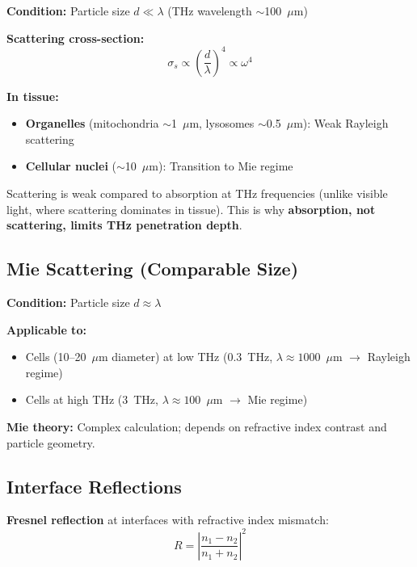 \textbf{Condition:} Particle size $d \ll \lambda$ (THz wavelength $\sim$100~$\mu$m)

\textbf{Scattering cross-section:}
\begin{equation}
\label{eq:rayleigh-scattering}
\sigma_s \propto \left(\frac{d}{\lambda}\right)^4 \propto \omega^4
\end{equation}

\textbf{In tissue:}
\begin{itemize}
\item \textbf{Organelles} (mitochondria $\sim$1~$\mu$m, lysosomes $\sim$0.5~$\mu$m): Weak Rayleigh scattering
\item \textbf{Cellular nuclei} ($\sim$10~$\mu$m): Transition to Mie regime
\end{itemize}

\begin{keyconcept}
Scattering is weak compared to absorption at THz frequencies (unlike visible light, where scattering dominates in tissue). This is why \textbf{absorption, not scattering, limits THz penetration depth}.
\end{keyconcept}

\subsection{Mie Scattering (Comparable Size)}
\label{subsec:mie-scattering}

\textbf{Condition:} Particle size $d \approx \lambda$

\textbf{Applicable to:}
\begin{itemize}
\item Cells (10--20~$\mu$m diameter) at low THz (0.3~THz, $\lambda \approx 1000$~$\mu$m $\rightarrow$ Rayleigh regime)
\item Cells at high THz (3~THz, $\lambda \approx 100$~$\mu$m $\rightarrow$ Mie regime)
\end{itemize}

\textbf{Mie theory:} Complex calculation; depends on refractive index contrast and particle geometry.

\subsection{Interface Reflections}
\label{subsec:interface-reflections}

\textbf{Fresnel reflection} at interfaces with refractive index mismatch:
\begin{equation}
\label{eq:fresnel-reflection}
R = \left| \frac{n_1 - n_2}{n_1 + n_2} \right|^2
\end{equation}

